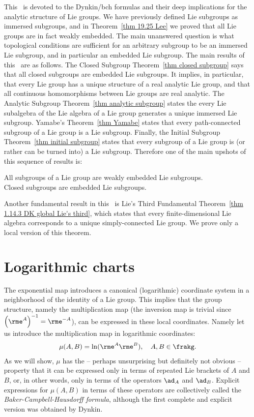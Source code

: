 This \chap\ is devoted to the Dynkin/\gls{bch} formulas and their deep implications for the analytic structure of Lie groups. We have previously defined Lie subgroups as immersed subgroups, and in Theorem~\ref{thm 19.25 Lee} we proved that all Lie groups are in fact weakly embedded. The main unanswered question is what topological conditions are sufficient for an arbitrary subgroup to be an immersed Lie subgroup, and in particular an embedded Lie subgroup. The main results of this \chap\ are as follows. The Closed Subgroup Theorem~\ref{thm closed subgroup} says that all closed subgroups are embedded Lie subgroups. It implies, in particular, that every Lie group has a unique structure of a real analytic Lie group, and that all continuous homomorphisms between Lie groups are real analytic. The Analytic Subgroup Theorem~\ref{thm analytic subgroup} states the every Lie subalgebra of the Lie algebra of a Lie group generates a unique immersed Lie subgroup. Yamabe's Theorem~\ref{thm Yamabe} states that every path-connected subgroup of a Lie group is a Lie subgroup.  Finally, the Initial Subgroup Theorem~\ref{thm initial subgroup} states that every subgroup of a Lie group is (or rather can be turned into) a Lie subgroup. Therefore one of the main upshots of this sequence of results is:
\begin{center}
    All subgroups of a Lie group are weakly embedded Lie subgroups.\\
    Closed subgroups are embedded Lie subgroups.
\end{center}
Another fundamental result in this \chap\ is Lie's Third Fundamental Theorem~\ref{thm 1.14.3 DK global Lie's third}, which states that every finite-dimensional Lie algebra corresponds to a unique simply-connected Lie group. We prove only a local version of this theorem.





\section{Logarithmic charts}\label{sec: product in log coordinates}

The exponential map introduces a canonical (logarithmic) coordinate system in a neighborhood of the identity of a Lie group. This implies that the group structure, namely the multiplication map (the inversion map is trivial since $\left(\rme^A\right)^{-1}=\rme^{-A}$), can be expressed in these local coordinates. Namely let us introduce the multiplication map in logarithmic coordinates:
\[\mu(A,B)=\ln(\rme^A\rme^B),\quad A,B\in\frakg.\]
As we will show, $\mu$ has the -- perhaps unsurprising but definitely not obvious -- property that it can be expressed only in terms of repeated Lie brackets of $A$ and $B$, or, in other words, only in terms of the operators $\ad_A$ and $\ad_B$. Explicit expressions for $\mu(A,B)$ in terms of these operators are collectively called the \emph{Baker-Campbell-Hausdorff formula}, although the first complete and explicit version was obtained by Dynkin.

